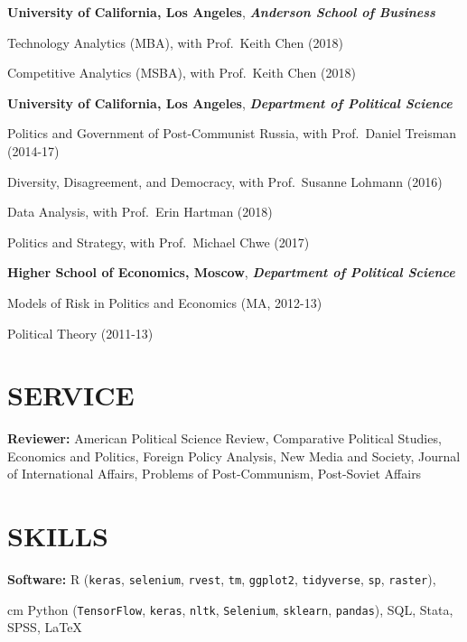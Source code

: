 \documentclass[11pt,]{article}
\begin{document}
\textbf{University of California, Los Angeles}, \textbf{\emph{Anderson
School of Business}}

\hskip 1cm Technology Analytics (MBA), with Prof.~Keith Chen (2018)

\hskip 1cm Competitive Analytics (MSBA), with Prof.~Keith Chen (2018)

\textbf{University of California, Los Angeles}, \textbf{\emph{Department
of Political Science}}

\hskip 1cm Politics and Government of Post-Communist Russia, with
Prof.~Daniel Treisman (2014-17)

\hskip 1cm Diversity, Disagreement, and Democracy, with Prof.~Susanne
Lohmann (2016)

\hskip 1cm Data Analysis, with Prof.~Erin Hartman (2018)

\hskip 1cm Politics and Strategy, with Prof.~Michael Chwe (2017)

\textbf{Higher School of Economics, Moscow}, \textbf{\emph{Department of
Political Science}}

\hskip 1cm Models of Risk in Politics and Economics (MA, 2012-13)

\hskip 1cm Political Theory (2011-13)

\hypertarget{service}{%
\section{SERVICE}\label{service}}

\textbf{Reviewer:} American Political Science Review, Comparative
Political Studies, Economics and Politics, Foreign Policy Analysis, New
Media and Society, Journal of International Affairs, Problems of
Post-Communism, Post-Soviet Affairs

\hypertarget{skills}{%
\section{SKILLS}\label{skills}}

\textbf{Software:} R (\texttt{keras}, \texttt{selenium}, \texttt{rvest},
\texttt{tm}, \texttt{ggplot2}, \texttt{tidyverse}, \texttt{sp},
\texttt{raster}),

 cm Python (\texttt{TensorFlow}, \texttt{keras},
\texttt{nltk}, \texttt{Selenium}, \texttt{sklearn}, \texttt{pandas}),
SQL, Stata, SPSS, \LaTeX
\end{document}
